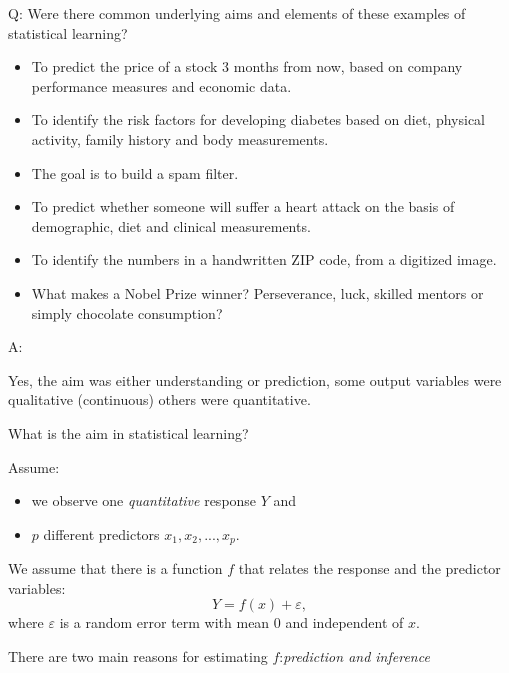 \documentclass[ignorenonframetext,]{beamer}
\providecommand{\tightlist}{%
  \setlength{\itemsep}{0pt}\setlength{\parskip}{0pt}}
\begin{document}
\begin{frame}

\begin{block}{Q: Were there common underlying aims and elements of these
examples of statistical learning?}

\begin{itemize}
\tightlist
\item
  To predict the price of a stock 3 months from now, based on company
  performance measures and economic data.
\item
  To identify the risk factors for developing diabetes based on diet,
  physical activity, family history and body measurements.
\item
  The goal is to build a spam filter.
\item
  To predict whether someone will suffer a heart attack on the basis of
  demographic, diet and clinical measurements.
\item
  To identify the numbers in a handwritten ZIP code, from a digitized
  image.
\item
  What makes a Nobel Prize winner? Perseverance, luck, skilled mentors
  or simply chocolate consumption?
\end{itemize}

\end{block}

\end{frame}

\begin{frame}

\begin{block}{A:}

Yes, the aim was either understanding or prediction, some output
variables were qualitative (continuous) others were quantitative.

\end{block}

\end{frame}

\begin{frame}

\begin{block}{What is the aim in statistical learning?}

Assume:

\begin{itemize}
\tightlist
\item
  we observe one \emph{quantitative} response \(Y\) and
\item
  \(p\) different predictors \(x_1, x_2,... , x_p\).
\end{itemize}

We assume that there is a function \(f\) that relates the response and
the predictor variables: \[ Y = f(x) + \varepsilon,\] where
\(\varepsilon\) is a random error term with mean 0 and independent of
\(x\).

There are two main reasons for estimating \(f\):\emph{prediction and
inference}

\end{block}

\end{frame}
\end{document}
